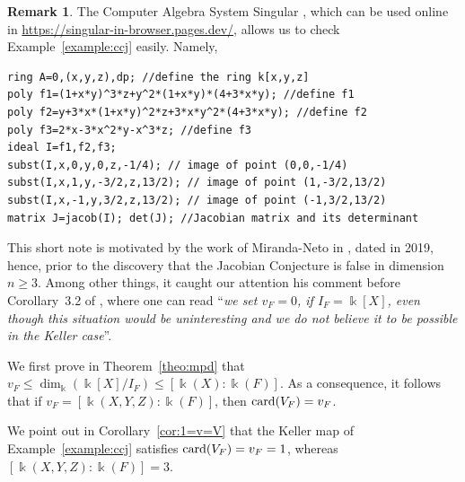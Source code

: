 \documentclass[11pt,reqno]{amsart}
\theoremstyle{definition}
\newtheorem{remark}[theorem]{Remark}
\newcommand{\mbk}{\mbox{$\Bbbk$}}
\newcommand{\card}{\mbox{${\rm card}$}}
\begin{document}
\begin{remark}
The Computer Algebra System {\sc Singular} \cite{dgps}, 
which can be used online in \url{https://singular-in-browser.pages.dev/}, allows us to check Example~\ref{example:ccj} easily. 
Namely,
\begin{verbatim}
ring A=0,(x,y,z),dp; //define the ring k[x,y,z]
poly f1=(1+x*y)^3*z+y^2*(1+x*y)*(4+3*x*y); //define f1
poly f2=y+3*x*(1+x*y)^2*z+3*x*y^2*(4+3*x*y); //define f2
poly f3=2*x-3*x^2*y-x^3*z; //define f3
ideal I=f1,f2,f3;
subst(I,x,0,y,0,z,-1/4); // image of point (0,0,-1/4)
subst(I,x,1,y,-3/2,z,13/2); // image of point (1,-3/2,13/2)
subst(I,x,-1,y,3/2,z,13/2); // image of point (-1,3/2,13/2)
matrix J=jacob(I); det(J); //Jacobian matrix and its determinant
\end{verbatim}
\end{remark}

This short note is motivated by the work of Miranda-Neto in \cite{mn}, dated in 2019, hence, prior 
to the discovery that the Jacobian Conjecture is false in dimension $n\geq 3$.  
Among other things, it caught our attention his comment
before Corollary~3.2 of \cite{mn}, where one can read 
``\emph{we set $v_F=0$, if $I_F=\mbk[X]$, even though this situation would be uninteresting and we do not believe it to be possible in the Keller case}''.

We first prove in Theorem~\ref{theo:mpd} that $v_F\leq \dim_{\Bbbk}(\mbk[X]/I_F)\leq
[\mbk(X):\mbk(F)]$. As a consequence, it follows that if $v_F=[\mbk(X,Y,Z):\mbk(F)]$, 
then $\card(V_F)=v_F$.

We point out in Corollary~\ref{cor:1=v=V} that the Keller map of Example~\ref{example:ccj} satisfies $\card(V_F)=v_F=1$, whereas $[\mbk(X,Y,Z):\mbk(F)]=3$. 
\end{document}
